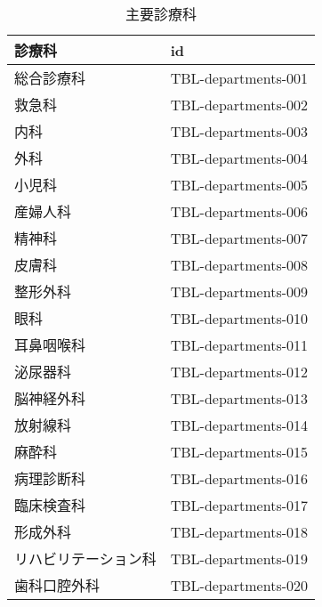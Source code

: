 \begin{xltabular}{\linewidth}{XX}
\caption{\label{tbl:departments}主要診療科} \\
\toprule
診療科 & id \\
\midrule
\endhead
総合診療科 & TBL-departments-001 \\
救急科 & TBL-departments-002 \\
内科 & TBL-departments-003 \\
外科 & TBL-departments-004 \\
小児科 & TBL-departments-005 \\
産婦人科 & TBL-departments-006 \\
精神科 & TBL-departments-007 \\
皮膚科 & TBL-departments-008 \\
整形外科 & TBL-departments-009 \\
眼科 & TBL-departments-010 \\
耳鼻咽喉科 & TBL-departments-011 \\
泌尿器科 & TBL-departments-012 \\
脳神経外科 & TBL-departments-013 \\
放射線科 & TBL-departments-014 \\
麻酔科 & TBL-departments-015 \\
病理診断科 & TBL-departments-016 \\
臨床検査科 & TBL-departments-017 \\
形成外科 & TBL-departments-018 \\
リハビリテーション科 & TBL-departments-019 \\
歯科口腔外科 & TBL-departments-020 \\
\bottomrule
\end{xltabular}

